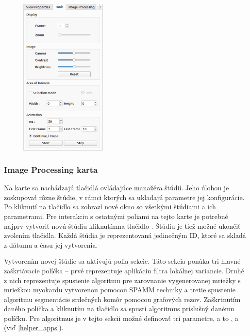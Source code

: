 {\begin {figure}[H]
        \centering
        \includegraphics[height=8cm]{media/existing_app/tabs/tools.png}
        \captionsetup{justification=centering}
\end {figure}

\clearpage

\subsubsection {Image Processing karta}\label{image_processing_tab}
Na  karte sa nachádzajú tlačidlá ovládajúce manažéra štúdií. Jeho úlohou je zoskupovať rôzne štúdie, v rámci ktorých sa ukladajú parametre jej konfigurácie. Po kliknutí na tlačidlo  sa zobrazí nové okno so všetkými štúdiami a ich parametrami. Pre interakciu s ostatnými poliami na tejto karte je potrebné najprv vytvoriť novú štúdiu kliknutím\newline na tlačidlo . Štúdiu je tiež možné ukončiť zvolením tlačidla\newline {}. Každá štúdia je reprezentovaná jedinečným ID, ktoré sa skladá z dátumu a času jej vytvorenia.

Vytvorením novej štúdie sa aktivujú polia  sekcie. Táto sekcia ponúka tri hlavné zaškrtávacie políčka -- prvé reprezentuje aplikáciu filtra lokálnej variancie. Druhé z nich reprezentuje spustenie algoritmu pre zarovnanie vygenerovanej mriežky s mriežkou myokardu vytvorenou pomocou SPAMM techniky a tretie spustenie algoritmu segmentácie srdečných komôr pomocou grafových rezov. Zaškrtnutím daného políčka a kliknutím na tlačidlo  sa spustí algoritmus príslušný danému políčku. Pre  algoritmus je v tejto sekcii možné definovať tri parametre, a to ,  a  (viď \ref{helper_apps}).

}
